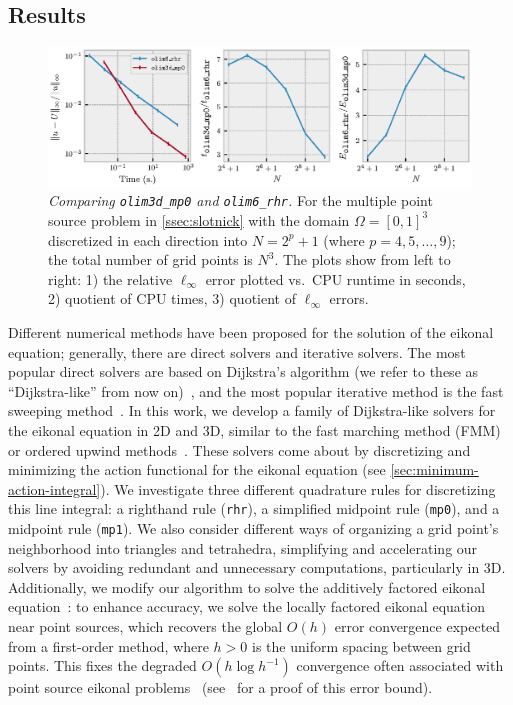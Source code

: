 \documentclass{article}
\begin{document}
\subsection{Results}

\begin{figure}
  \centering
  \includegraphics[width=\linewidth]{intro.eps}
  \caption{\emph{Comparing \texttt{olim3d\_mp0} and
      \texttt{olim6\_rhr}.} For the multiple point source problem in
    \cref{ssec:slotnick} with the domain $\Omega = [0, 1]^3$
    discretized in each direction into $N = 2^p + 1$ (where
    $p = 4, 5, \hdots, 9$); the total number of grid points is
    $N^3$. The plots show from left to right: 1) the relative
    $\ell_\infty$ error plotted vs.\ CPU runtime in seconds, 2)
    quotient of CPU times, 3) quotient of $\ell_\infty$
    errors.}\label{fig:intro}
\end{figure}

Different numerical methods have been proposed for the solution of the
eikonal equation; generally, there are direct solvers and iterative
solvers. The most popular direct solvers are based on Dijkstra's
algorithm (we refer to these as ``Dijkstra-like'' from now
on)~\cite{tsitsiklis1995efficient,sethian1996fast}, and the most
popular iterative method is the fast sweeping
method~\cite{tsai2003fast,zhao2005fast}. In this work, we develop a
family of Dijkstra-like solvers for the eikonal equation in 2D and 3D,
similar to the fast marching method (FMM) or ordered upwind
methods~\cite{sethian1996fast,sethian2003ordered}. These solvers come
about by discretizing and minimizing the action functional for the
eikonal equation (see \cref{sec:minimum-action-integral}). We
investigate three different quadrature rules for discretizing this
line integral: a righthand rule (\texttt{rhr}), a simplified midpoint
rule (\texttt{mp0}), and a midpoint rule (\texttt{mp1}). We also
consider different ways of organizing a grid point's neighborhood into
triangles and tetrahedra, simplifying and accelerating our solvers by
avoiding redundant and unnecessary computations, particularly in
3D. Additionally, we modify our algorithm to solve the additively
factored eikonal equation~\cite{luo2012fast}: to enhance accuracy, we
solve the locally factored eikonal equation near point sources, which
recovers the global $O(h)$ error convergence expected from a
first-order method, where $h > 0$ is the uniform spacing between grid
points. This fixes the degraded $O(h \log h^{-1})$ convergence often
associated with point source eikonal problems~\cite{qi2018corner}
(see~\cite{zhao2005fast} for a proof of this error bound).
\end{document}
